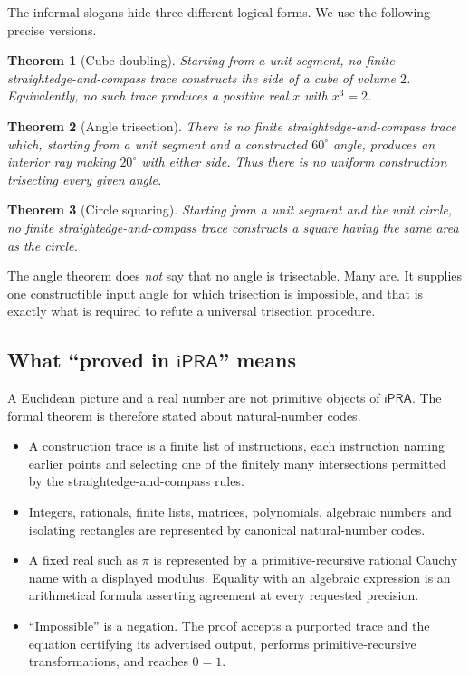 \documentclass[11pt]{article}
\newtheorem{theorem}{Theorem}[section]
\newcommand{\ipra}{\mathsf{iPRA}}
\begin{document}
The informal slogans hide three different logical forms.  We use the following precise versions.

\begin{theorem}[Cube doubling]
Starting from a unit segment, no finite straightedge-and-compass trace constructs the side of a cube of volume $2$.  Equivalently, no such trace produces a positive real $x$ with $x^3=2$.
\end{theorem}

\begin{theorem}[Angle trisection]
There is no finite straightedge-and-compass trace which, starting from a unit segment and a constructed $60^\circ$ angle, produces an interior ray making $20^\circ$ with either side.  Thus there is no uniform construction trisecting every given angle.
\end{theorem}

\begin{theorem}[Circle squaring]
Starting from a unit segment and the unit circle, no finite straightedge-and-compass trace constructs a square having the same area as the circle.
\end{theorem}

The angle theorem does \emph{not} say that no angle is trisectable.  Many are.  It supplies one constructible input angle for which trisection is impossible, and that is exactly what is required to refute a universal trisection procedure.

\subsection{What ``proved in $\ipra$'' means}

A Euclidean picture and a real number are not primitive objects of $\ipra$.  The formal theorem is therefore stated about natural-number codes.

\begin{itemize}
\item A construction trace is a finite list of instructions, each instruction naming earlier points and selecting one of the finitely many intersections permitted by the straightedge-and-compass rules.
\item Integers, rationals, finite lists, matrices, polynomials, algebraic numbers and isolating rectangles are represented by canonical natural-number codes.
\item A fixed real such as $\pi$ is represented by a primitive-recursive rational Cauchy name with a displayed modulus.  Equality with an algebraic expression is an arithmetical formula asserting agreement at every requested precision.
\item ``Impossible'' is a negation.  The proof accepts a purported trace and the equation certifying its advertised output, performs primitive-recursive transformations, and reaches $0=1$.
\end{itemize}
\end{document}
